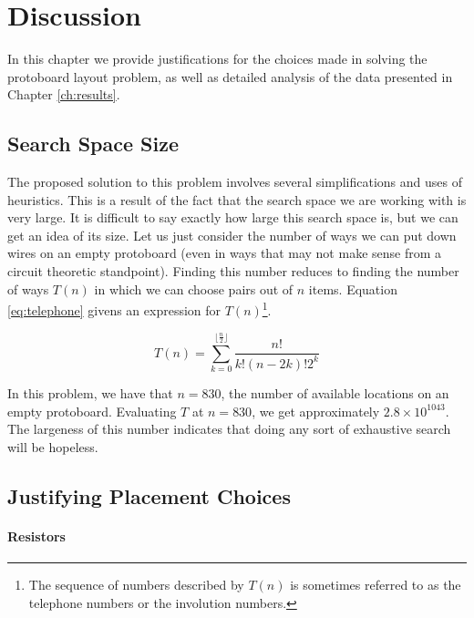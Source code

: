 
\chapter{Discussion}
\label{ch:discussion}

In this chapter we provide justifications for the choices made in solving the
protoboard layout problem, as well as detailed analysis of the data presented in
Chapter \ref{ch:results}.

\section{Search Space Size}
\label{sec:search_space_size}

The proposed solution to this problem involves several simplifications and uses
of heuristics. This is a result of the fact that the search space we are working
with is very large. It is difficult to say exactly how large this search space
is, but we can get an idea of its size. Let us just consider the number of ways
we can put down wires on an empty protoboard (even in ways that may not make
sense
from a circuit theoretic standpoint). Finding this number reduces to finding the
number of ways $T(n)$ in which we can choose pairs out of $n$ items. Equation
\ref{eq:telephone} givens an expression for $T(n)$\footnote{The sequence of
numbers described by $T(n)$ is sometimes referred to as the telephone numbers
or the involution numbers.}.

\begin{equation}
T(n) = \sum_{k = 0}^{\lfloor \frac{n}{2} \rfloor}{\frac{n!}{k! (n - 2k)! 2^k}}
\label{eq:telephone}
\end{equation}

In this problem, we have that $n = 830$, the number of available locations on an
empty protoboard. Evaluating $T$ at $n = 830$, we get approximately
$2.8\times10^{1043}$.
The largeness of this number indicates that doing any sort of exhaustive search
will be hopeless.

\section{Justifying Placement Choices}
\label{sec:justify_placement}

\subsubsection{Resistors}

